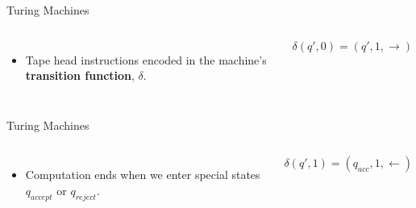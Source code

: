 \documentclass[c]{beamer}
\begin{document}
\begin{frame}{Turing Machines}
  \begin{columns}

    \begin{itemize}
    \item Tape head instructions encoded in the machine's
      \textbf{transition function}, $\delta$.
    \end{itemize}
    $$\delta(q', 0) = (q', 1, \rightarrow)$$
  \end{columns}
\end{frame}

\begin{frame}{Turing Machines}
  \begin{columns}

    \begin{itemize}
    \item Computation ends when we enter special states $q_{accept}$
      or $q_{reject}$.
    \end{itemize}
    $$\delta(q', 1) = (q_{acc}, 1, \leftarrow)$$
  \end{columns}
\end{frame}




  
\end{document}
